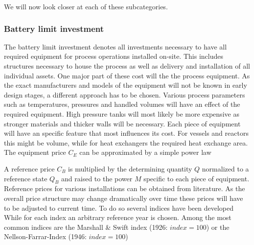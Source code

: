 %

We will now look closer at each of these subcategories. 

\subsubsection{Battery limit investment} 
The battery limit investment denotes all investments necessary to have all required equipment 
for process operations installed on-site. This includes structures necessary to house the process as well as
delivery and installation of all individual assets.  One major part of these cost will the the process 
equipment. As the exact manufacturers and models of the equipment will not be known in early design 
stages, a different approach has to be chosen. Various process parameters such as temperatures, 
pressures and handled volumes will have an effect of the required equipment. High pressure tanks will 
most likely be more expensive as stronger materials and thicker walls will be necessary. Each piece of 
equipment will have an specific feature that most influences its cost. For vessels and reactors this might be 
volume, while for heat exchangers the required heat exchange area. The equipment price $C_E$ can be 
approximated by a simple power law
%

A reference price $C_B$ is multiplied by the determining quantity $Q$ normalized to a reference state 
$Q_B$ and raised to the power $M$ specific to each piece of equipment. Reference prices for various 
installations can be obtained from literature. 
As the overall price structure may change dramatically over time these prices will have to be adjusted to 
current time. To do so several indices have been developed
%
While for each index an arbitrary reference year is chosen. Among the most common indices are the 
Marshall \& Swift index (1926: $index = 100$) or the Nellson-Farrar-Index (1946: $index = 100$)

